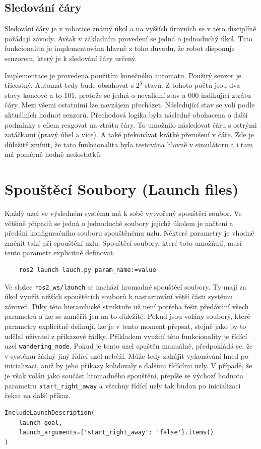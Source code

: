 \subsection*{Sledování čáry}
Sledování čáry je v robotice známý úkol a na vyšších úrovních se v této disciplíně pořádají závody. Avšak v základním provedení se jedná o jednoduchý úkol. Tato funkcionalita je implementována hlavně z toho důvodu, že robot disponuje senzorem, který je k sledování čáry určený.

Implementace je provedena použitím konečného automatu. Použitý senzor je třícestný. Automat tedy bude obsahovat s $2^3$ stavů. Z tohoto počtu jsou dva stavy koncové a to 101, protože se jedná o nevalidní stav a 000 indikující ztrátu čáry. Mezi všemi ostatními lze navzájem přecházet. Následující stav se volí podle aktuálních hodnot senzorů. Přechodová logika byla následně obohacena o další podmínky s cílem reagovat na ztrátu čáry. To umožnilo následovat čáru s ostrými zatáčkami (pravý úhel a více). A také překonávat krátké přerušení v čáře. Zde je důležité zmínit, že tato funkcionalita byla testována hlavně v simulátoru a i tam má poměrně hodně nedostatků. 

\section{Spouštěcí Soubory (Launch files)}
Každý uzel ve výsledném systému má k sobě vytvořený spouštěcí soubor. Ve většině případů se jedná o jednoduché soubory jejichž úkolem je načtení a předání konfiguračního souboru spouštěnému uzlu. Některé parametry je vhodné změnit také při spouštění uzlu. Spouštěcí soubory, které toto umožňují, musí tento parametr explicitně definovat. 
\begin{verbatim}
	ros2 launch lauch.py param_name:=value
\end{verbatim}
Ve složce \verb|ros2_ws/launch| se nachází hromadné spouštěcí soubory. Ty mají za úkol využít nižších spouštěcích souborů k nastartování větší části systému zároveň. Díky této hierarchické struktuře už není potřeba řešit předávání všech parametrů a lze se zaměřit jen na to důležité. Pokud jsou volány soubory, které parametry explicitně definují, lze je v tento moment přepsat, stejně jako by to udělal uživatel z příkazové řádky. Příkladem využití této funkcionality je řídící uzel \verb|wandering_node|. Pokud je tento uzel spuštěn manuálně, předpokládá se, že v systému žádný jiný řídící uzel neběží. Může tedy zahájit vykonávání hned po inicializaci, aniž by jeho příkazy kolidovaly s dalšími řídícími uzly. V případě, že je však volán jako součást hromadného spouštění, přepíše se výchozí hodnota parametru \verb|start_right_away| a všechny řídící uzly tak budou po inicializaci čekat na další příkaz.
\begin{verbatim}
IncludeLaunchDescription(
    launch_goal,
    launch_arguments={'start_right_away': 'false'}.items()
)
\end{verbatim}

